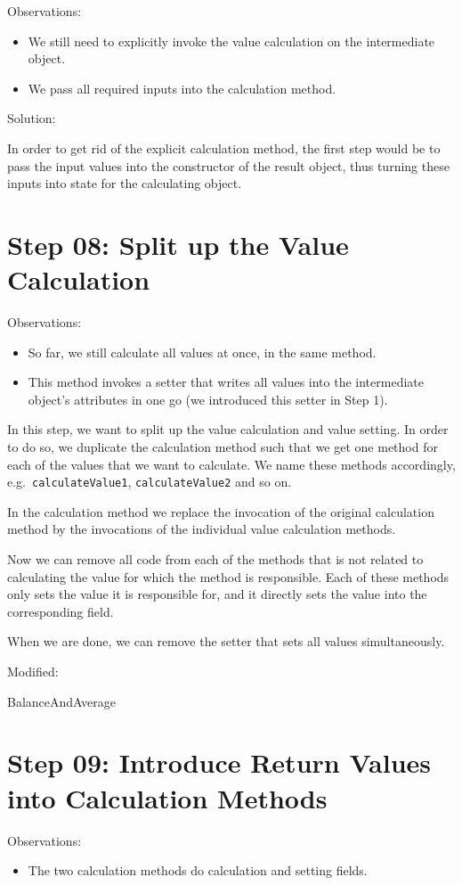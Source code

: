 \documentclass[a4paper,fleqn,titlepage,11pt]{article}
\begin{document}
Observations:
\begin{itemize}
\item We still need to explicitly invoke the value calculation on the intermediate object. 
\item We pass all required inputs into the calculation method.
\end{itemize}

Solution:

In order to get rid of the explicit calculation method, the first step would be to pass the input values into the constructor of the result object, thus turning these inputs into state for the calculating object.

\section*{Step 08: Split up the Value Calculation}

Observations:
\begin{itemize}
\item So far, we still calculate all values at once, in the same method. 
\item This method invokes a setter that writes all values into the intermediate object's attributes in one go (we introduced this setter in Step 1).
\end{itemize}

In this step, we want to split up the value calculation and value setting. In order to do so, we duplicate the calculation method such that we get one method for each of the values that we want to calculate. We name these methods accordingly, e.g.~\texttt{calculateValue1}, \texttt{calculateValue2} and so on.

In the calculation method we replace the invocation of the original calculation method by the invocations of the individual value calculation methods.

Now we can remove all code from each of the methods that is not related to calculating the value for which the method is responsible. Each of these methods only sets the value it is responsible for, and it directly sets the value into the corresponding field.

When we are done, we can remove the setter that sets all values simultaneously.

Modified:

BalanceAndAverage

\section*{Step 09: Introduce Return Values into Calculation Methods}
Observations:
\begin{itemize}
\item The two calculation methods do calculation and setting fields. 
\end{itemize}
\end{document}
